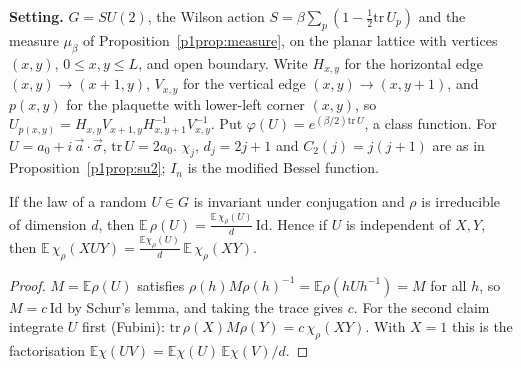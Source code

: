 \newpage
{}

\noindent\textbf{Setting.} $G=SU(2)$, the Wilson action $S=\beta\sum_p(1-\tfrac12\mathrm{tr}\,U_p)$ and the measure
$\mu_\beta$ of Proposition~\ref{p1prop:measure}, on the planar lattice with vertices $(x,y)$, $0\le x,y\le L$, and open
boundary. Write $H_{x,y}$ for the horizontal edge $(x,y)\to(x+1,y)$, $V_{x,y}$ for the vertical edge $(x,y)\to(x,y+1)$,
and $p(x,y)$ for the plaquette with lower-left corner $(x,y)$, so $U_{p(x,y)}=H_{x,y}V_{x+1,y}H_{x,y+1}^{-1}V_{x,y}^{-1}$.
Put $\varphi(U)=e^{(\beta/2)\mathrm{tr}\,U}$, a class function. For $U=a_0+i\,\vec a\cdot\vec\sigma$, $\mathrm{tr}\,U=2a_0$.
$\chi_j$, $d_j=2j+1$ and $C_2(j)=j(j+1)$ are as in Proposition~\ref{p1prop:su2}; $I_n$ is the modified Bessel function.

\begin{lemma}\label{p2lem:central}
 If the law of a random $U\in G$ is invariant under conjugation and $\rho$ is irreducible of
dimension $d$, then $\mathbb{E}\,\rho(U)=\frac{\mathbb{E}\,\chi_\rho(U)}{d}\,\mathrm{Id}$. Hence if $U$ is independent of
$X,Y$, then $\mathbb{E}\,\chi_\rho(XUY)=\frac{\mathbb{E}\chi_\rho(U)}{d}\,\mathbb{E}\,\chi_\rho(XY)$.
\end{lemma}
\begin{proof}
$M=\mathbb{E}\rho(U)$ satisfies $\rho(h)M\rho(h)^{-1}=\mathbb{E}\rho(hUh^{-1})=M$ for all $h$, so $M=c\,\mathrm{Id}$ by
Schur's lemma, and taking the trace gives $c$. For the second claim integrate $U$ first (Fubini):
$\mathrm{tr}\,\rho(X)M\rho(Y)=c\,\chi_\rho(XY)$. With $X=1$ this is the factorisation
$\mathbb{E}\chi(UV)=\mathbb{E}\chi(U)\,\mathbb{E}\chi(V)/d$.
\end{proof}

